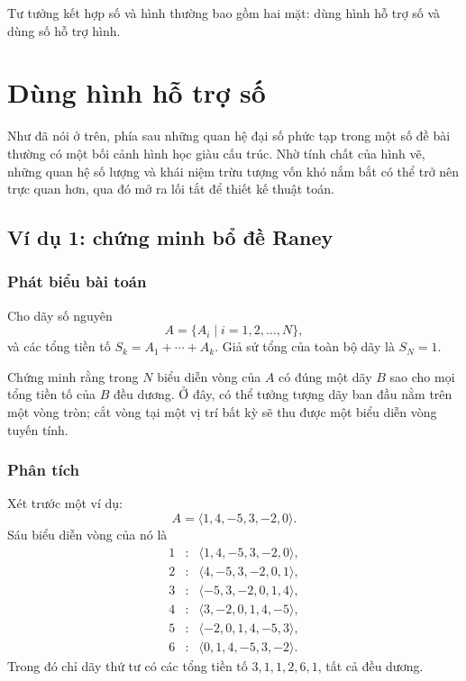 \documentclass[11pt]{article}
\begin{document}
Tư tưởng kết hợp số và hình thường bao gồm hai mặt: dùng hình hỗ trợ số và
dùng số hỗ trợ hình.

\section{Dùng hình hỗ trợ số}

Như đã nói ở trên, phía sau những quan hệ đại số phức tạp trong một số đề bài
thường có một bối cảnh hình học giàu cấu trúc. Nhờ tính chất của hình vẽ,
những quan hệ số lượng và khái niệm trừu tượng vốn khó nắm bắt có thể trở nên
trực quan hơn, qua đó mở ra lối tắt để thiết kế thuật toán.

\subsection{Ví dụ 1: chứng minh bổ đề Raney}

\subsubsection*{Phát biểu bài toán}

Cho dãy số nguyên
\[
  A=\{A_i\mid i=1,2,\ldots,N\},
\]
và các tổng tiền tố $S_k=A_1+\cdots+A_k$. Giả sử tổng của toàn bộ dãy là
$S_N=1$.

Chứng minh rằng trong $N$ biểu diễn vòng của $A$ có đúng một dãy $B$ sao cho
mọi tổng tiền tố của $B$ đều dương. Ở đây, có thể tưởng tượng dãy ban đầu nằm
trên một vòng tròn; cắt vòng tại một vị trí bất kỳ sẽ thu được một biểu diễn
vòng tuyến tính.

\subsubsection*{Phân tích}

Xét trước một ví dụ:
\[
  A=\langle 1,4,-5,3,-2,0\rangle .
\]
Sáu biểu diễn vòng của nó là
\[
\begin{array}{rcl}
1&:&\langle 1,4,-5,3,-2,0\rangle,\\
2&:&\langle 4,-5,3,-2,0,1\rangle,\\
3&:&\langle -5,3,-2,0,1,4\rangle,\\
4&:&\langle 3,-2,0,1,4,-5\rangle,\\
5&:&\langle -2,0,1,4,-5,3\rangle,\\
6&:&\langle 0,1,4,-5,3,-2\rangle.
\end{array}
\]
Trong đó chỉ dãy thứ tư có các tổng tiền tố
$3,1,1,2,6,1$, tất cả đều dương.
\end{document}
